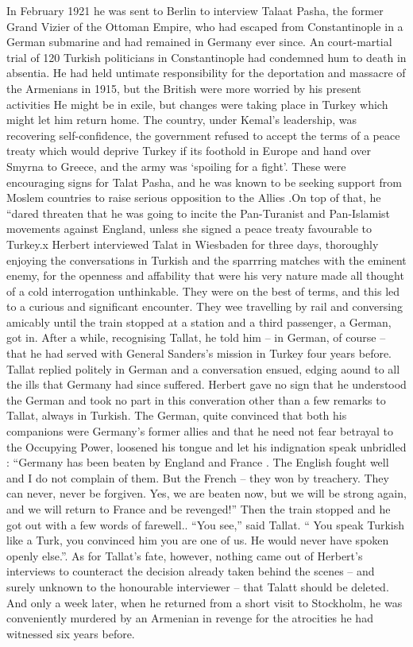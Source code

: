 In February 1921 he was sent to Berlin to interview Talaat Pasha, the former Grand Vizier of the Ottoman Empire, who had escaped from Constantinople in a German submarine and had remained in Germany ever since. An court-martial trial of 120 Turkish politicians in Constantinople had condemned hum to death in absentia. He had held untimate responsibility for the deportation and massacre of the Armenians in 1915, but the British were more worried by his present activities He might be in exile, but changes were taking place in Turkey which might let him return home. The country, under Kemal’s leadership, was recovering self-confidence, the government refused to accept the terms of a peace treaty which would deprive Turkey if its foothold in Europe and hand over Smyrna to Greece, and the army was ‘spoiling for a fight’. These were encouraging signs for Talat Pasha, and he was known to be seeking support from Moslem countries to raise serious opposition to the Allies .On top of that, he “dared threaten that he was going to incite the Pan-Turanist and Pan-Islamist movements against England, unless she signed a peace treaty favourable to Turkey.x Herbert interviewed Talat in Wiesbaden for three days, thoroughly enjoying the conversations in Turkish and the sparrring matches with the eminent enemy, for the openness and affability that were his very nature made all thought of a cold interrogation unthinkable. They were on the best of terms, and this led to a curious and significant encounter. They wee travelling by rail and conversing amicably until the train stopped at a station and a third passenger, a German, got in. After a while, recognising Tallat, he told him – in German, of course – that he had served with General Sanders’s mission in Turkey four years before. Tallat replied politely in German and a conversation ensued, edging aound to all the ills that Germany had since suffered. Herbert gave no sign that he understood the German and took no part in this converation other than a few remarks to Tallat, always in Turkish. The German, quite convinced that both his companions were Germany’s former allies and that he need not fear betrayal to the Occupying Power, loosened his tongue and let his indignation speak unbridled : “Germany has been beaten by England and France . The English fought well and I do not complain of them. But the French – they won by treachery. They can never, never be forgiven. Yes, we are beaten now, but we will be strong again, and we will return to France and be revenged!” Then the train stopped and he got out with a few words of farewell.. “You see,” said Tallat. “ You speak Turkish like a Turk, you convinced him you are one of us. He would never have spoken openly else.”. As for Tallat’s fate, however, nothing came out of Herbert’s interviews to counteract the decision already taken behind the scenes – and surely unknown to the honourable interviewer – that Talatt should be deleted. And only a week later, when he returned from a short visit to Stockholm, he was conveniently murdered by an Armenian in revenge for the atrocities he had witnessed six years before. 

